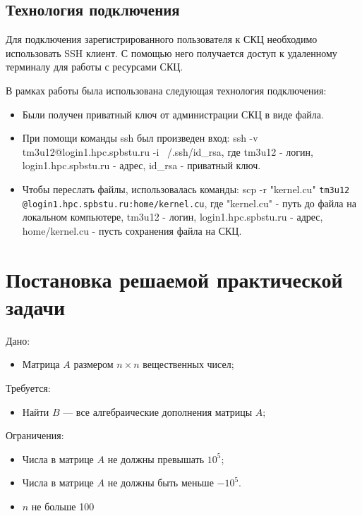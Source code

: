 \documentclass[a4paper, final]{article}
\begin{document}
\subsection{Технология подключения}

Для подключения зарегистрированного пользователя к СКЦ необходимо использовать
SSH клиент. С помощью него получается доступ к удаленному терминалу для работы
с ресурсами СКЦ.

В рамках работы была использована следующая технология подключения:
\begin{itemize}
    \item Были получен приватный ключ от администрации СКЦ в виде файла.
    \item При помощи команды ssh был произведен вход: ssh -v tm3u12@login1.hpc.spbstu.ru -i ~/.ssh/id\_rsa, где tm3u12 - логин, login1.hpc.spbstu.ru - адрес, id\_rsa - приватный ключ.
    \item Чтобы переслать файлы, использовалась команды: scp -r "kernel.cu" \texttt{tm3u12 @login1.hpc.spbstu.ru:home/kernel.cu}, где "kernel.cu" - путь до файла на локальном компьютере, tm3u12 - логин, login1.hpc.spbstu.ru - адрес, home/kernel.cu - пусть сохранения файла на СКЦ.
\end{itemize}

\newpage
\section{Постановка решаемой практической задачи}

Дано:
\begin{itemize}
    \item Матрица $A$ размером $n \times n$ вещественных чисел;
\end{itemize}

Требуется: 
\begin{itemize}
    \item Найти $B$ --- все алгебраические дополнения матрицы $A$;
\end{itemize}

Ограничения:
\begin{itemize}
    \item Числа в матрице $A$ не должны превышать $10^5$;
    \item Числа в матрице $A$ не должны быть меньше $-10^5$.
    \item $n$ не больше 100
\end{itemize}
\end{document}
